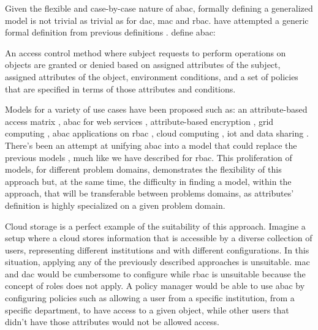 Given the flexible and case-by-case nature of \gls{abac}, formally defining a generalized model is not trivial as trivial as for \gls{dac}, \gls{mac} and \gls{rbac}. \citeauthor{hu_guide_2014} \cite{hu_guide_2014} have attempted a generic formal definition from previous definitions \cite{wang_logic-based_2004, yuan_attributed_2005, cruz_constraint_2009}. \citeauthor{hu_guide_2014} \cite{hu_guide_2014} define \gls{abac}:

\begin{displayquote}
    An access control method where subject requests to perform operations on objects are granted or denied based on assigned attributes of the subject, assigned attributes of the object, environment conditions, and a set of policies that are specified in terms of those attributes and conditions.
\end{displayquote}

Models for a variety of use cases have been proposed such as: an attribute-based access matrix \cite{zhang_attribute-based_2005}, \gls{abac} for web services \cite{yuan_attributed_2005}, attribute-based encryption \cite{goyal_attribute-based_2006, wang_hierarchical_2010}, grid computing \cite{lang_flexible_2009}, \gls{abac} applications on \gls{rbac} \cite{kuhn_adding_2010}, cloud computing \cite{wan_hasbe:_2012, yang_attribute-based_2013}, \gls{iot} \cite{bhatt_access_2017, ouaddah_access_2017} and data sharing \cite{yu_attribute_2010}. There's been an attempt at unifying \gls{abac} into a model that could replace the previous models \cite{jin_unified_2012}, much like we have described for \gls{rbac}. This proliferation of models, for different problem domains, demonstrates the flexibility of this approach but, at the same time, the difficulty in finding a model, within the approach, that will be transferable between problems domains, as attributes' definition is highly specialized on a given problem domain.

Cloud storage is a perfect example of the suitability of this approach. Imagine a setup where a cloud stores information that is accessible by a diverse collection of users, representing different institutions and with different configurations. In this situation, applying any of the previously described approaches is unsuitable. \gls{mac} and \gls{dac} would be cumbersome to configure while \gls{rbac} is unsuitable because the concept of roles does not apply. A policy manager would be able to use \gls{abac} by configuring policies such as allowing a user from a specific institution, from a specific department, to have access to a given object, while other users that didn't have those attributes would not be allowed access.

